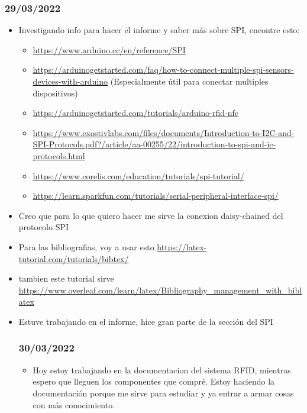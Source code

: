 \documentclass[../informe_krapp.tex]{subfiles}
\begin{document}
\subsubsection{29/03/2022}
\begin{itemize}
	\item Investigando info para hacer el informe y saber más sobre SPI, encontre esto:
	      \begin{itemize}
		      \item \url{https://www.arduino.cc/en/reference/SPI}
		      \item \url{https://arduinogetstarted.com/faq/how-to-connect-multiple-spi-sensors-devices-with-arduino} (Especialmente útil para conectar multiples dispositivos)
		      \item \url{https://arduinogetstarted.com/tutorials/arduino-rfid-nfc}
		      \item \url{https://www.exostivlabs.com/files/documents/Introduction-to-I2C-and-SPI-Protocols.pdf?/article/aa-00255/22/introduction-to-spi-and-ic-protocols.html}
		      \item \url{https://www.corelis.com/education/tutorials/spi-tutorial/}
		      \item \url{https://learn.sparkfun.com/tutorials/serial-peripheral-interface-spi/}
	      \end{itemize}
	\item Creo que para lo que quiero hacer me sirve la conexion daisy-chained
	      del protocolo SPI
	\item Para las bibliografias, voy a usar esto \url{https://latex-tutorial.com/tutorials/bibtex/}
	\item tambien este tutorial sirve \url{https://www.overleaf.com/learn/latex/Bibliography_management_with_biblatex}
	\item Estuve trabajando en el informe, hice gran parte de la sección del SPI

	      \subsubsection{30/03/2022}
	      \begin{itemize}
		      \item Hoy estoy trabajando en la documentacion del sistema RFID, mientras espero
		            que lleguen los componentes que compré. Estoy haciendo la documentación porque
		            me sirve para estudiar y ya entrar a armar cosas con más conocimiento.
	      \end{itemize}
\end{itemize}
\end{document}
